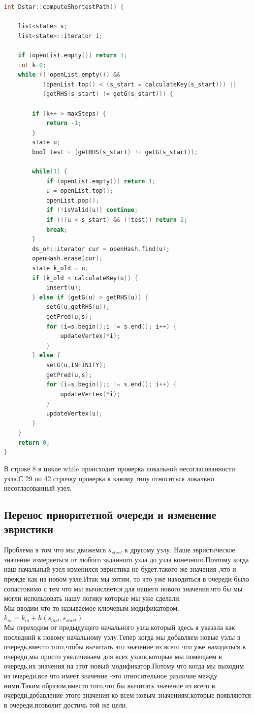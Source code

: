 \documentclass[12pt]{article}
\begin{document}
\begin{lstlisting}[language=C,style=C]
int Dstar::computeShortestPath() {

    list<state> s;
    list<state>::iterator i;

    if (openList.empty()) return 1;
    int k=0;
    while ((!openList.empty()) &&
           (openList.top() < (s_start = calculateKey(s_start))) ||
           (getRHS(s_start) != getG(s_start))) {

        if (k++ > maxSteps) {
            return -1;
        }
        state u;
        bool test = (getRHS(s_start) != getG(s_start));

        while(1) {
            if (openList.empty()) return 1;
            u = openList.top();
            openList.pop();
            if (!isValid(u)) continue;
            if (!(u < s_start) && (!test)) return 2;
            break;
        }
        ds_oh::iterator cur = openHash.find(u);
        openHash.erase(cur);
        state k_old = u;
        if (k_old < calculateKey(u)) { 
            insert(u);
        } else if (getG(u) > getRHS(u)) { 
            setG(u,getRHS(u));
            getPred(u,s);
            for (i=s.begin();i != s.end(); i++) {
                updateVertex(*i);
            }
        } else {   
            setG(u,INFINITY);
            getPred(u,s);
            for (i=s.begin();i != s.end(); i++) {
                updateVertex(*i);
            }
            updateVertex(u);
        }
    }
    return 0;
}
\end{lstlisting}
В строке 8 в цикле while происходит проверка локальной несогласованности узла.С 29 по 42 строчку проверка к какому типу относиться локально несогласованный узел.
\hypertarget{b0}{\subsection*{Перенос приоритетной очереди и изменение эвристики}}
Проблема в том что мы движемся $s_{start}$ к другому узлу. Наше эвристическое значение измеряеться от любого заданного узла до узла конечного.Поэтому когда наш начальный узел изменился эвристика не будет,такого же значения ,что и прежде как на новом узле.Итак мы хотим, то что уже находиться в очереди было сопастовимо с тем что мы вычисляется для нашего нового значения,что бы мы могли использовать нашу логику которые мы уже сделали.\\
Мы вводим что-то называемое ключевым модификатором.\\$k_m=k_m+h(s_{last},s_{start})$\\ Мы переходим от предыдущего начального узла,который здесь я указала как последний к новому начальному узлу.Тепер когда мы добавляем новые узлы в очередь,вместо того,чтобы вычитать это значение из всего что уже находиться в очереди,мы просто увеличиваем для всех узлов,которые мы помещаем в очередь,их значения на этот новый модификатор.Потому что когда мы выходим из очереди,все что имеет значение -это относительное различие между ними.Таким образом,вместо того,что бы вычитать значение из всего в очереди,добавление этого значения ко всем новым значениям,которые появляются в очереди,позволит достичь той же цели.\\
\end{document}
